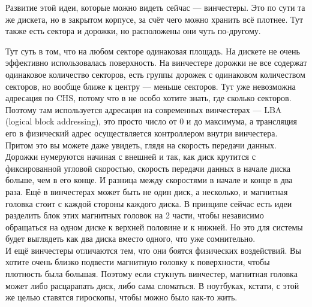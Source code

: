 \documentclass{article}
\begin{document}
    Развитие этой идеи, которые можно видеть сейчас --- винчестеры. Это по сути та же дискета, но в закрытом корпусе, за счёт чего можно хранить всё плотнее. Тут также есть сектора и дорожки, но расположены они чуть по-другому.
    \begin{center}
    \end{center}
    Тут суть в том, что на любом секторе одинаковая площадь. На дискете не очень эффективно использовалась поверхность. На винчестере дорожки не все содержат одинаковое количество секторов, есть группы дорожек с одинаковом количеством секторов, но вообще ближе к центру --- меньше секторов. Тут уже невозможна адресация по CHS, потому что в не особо хотите знать, где сколько секторов. Поэтому там используется адресация на современных винчестерах --- LBA (logical block addressing), это просто число от 0 и до максимума, а трансляция его в физический адрес осуществляется контроллером внутри винчестера. Притом это вы можете даже увидеть, глядя на скорость передачи данных. Дорожки нумеруются начиная с внешней и так, как диск крутится с фиксированной угловой скоростью, скорость передачи данных в начале диска больше, чем в его конце. И разница между скоростями в начале и конце в два раза. Ещё в винчестерах может быть не один диск, а несколько, и магнитная головка стоит с каждой стороны каждого диска. В принципе сейчас есть идеи разделить блок этих магнитных головок на 2 части, чтобы независимо обращаться на одном диске к верхней половине и к нижней. Но это для системы будет выглядеть как два диска вместо одного, что уже сомнительно.\\
    И ещё винчестеры отличаются тем, что они боятся физических воздействий. Вы хотите очень близко подвести магнитную головку к поверхности, чтобы плотность была большая. Поэтому если стукнуть винчестер, магнитная головка может либо расцарапать диск, либо сама сломаться. В ноутбуках, кстати, с этой же целью ставятся гироскопы, чтобы можно было как-то жить.\\
\end{document}

